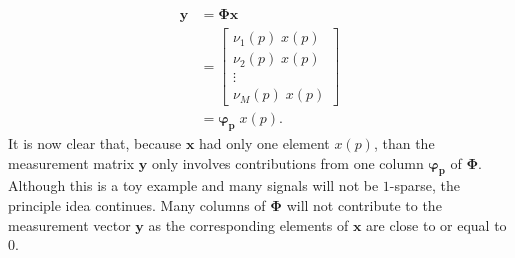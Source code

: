 \begin{example}
\begin{align*}
  \boldsymbol{y} &= \boldsymbol{\Phi} \boldsymbol{x}\\
   &=   \begin{bmatrix}
    \nu_1(p) \; x(p) \\
    \nu_2(p) \;  x(p) \\
    \vdots \\
    \nu_M(p) \; x(p)
   \end{bmatrix} \\
 &= \boldsymbol{\varphi_p}\; x(p).
\end{align*}
It is now clear that, because  $\boldsymbol{x}$ had only one element $x(p)$, than the measurement matrix $\boldsymbol{y}$ only involves contributions from one column $\boldsymbol{\varphi_p}$ of $\boldsymbol{\Phi}$. Although this is a toy example and many signals will not be $1$-sparse, the principle idea continues. Many columns of $\boldsymbol{\Phi}$ will not contribute to the measurement vector $\boldsymbol{y}$ as the corresponding elements of $\boldsymbol{x}$ are close to or equal to 0. 
\end{example}





